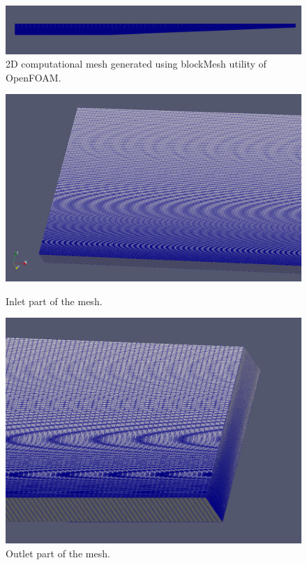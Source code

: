\documentclass[a4paper]{article}
\begin{document}
\begin{figure}[H]
    \centering
    \includegraphics[width=1\textwidth]{mesh1.png}
    \caption{\small 2D computational mesh generated using blockMesh utility of OpenFOAM.}
    \label{fig:mesh1}
\end{figure} 
\vspace{0.3cm}
\begin{figure}[H]
    \begin{minipage}{0.53\textwidth}
        \centering
        \includegraphics[width=\textwidth]{mesh2.png}
        \caption{\small Inlet part of the mesh.}
        \label{fig:mesh2}
    \end{minipage} 
    \hfill
    \begin{minipage}{0.45\textwidth}
        \centering
        \includegraphics[width=\textwidth]{mesh3.png}
        \caption{\small Outlet part of the mesh.}
        \label{fig:mesh3}
    \end{minipage} 
\end{figure}
\end{document}
